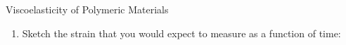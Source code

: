\begin{activity}{Viscoelasticity of Polymeric Materials}
\begin{exercises}
\begin{enumerate}
\begin{enumerate}
						\item Sketch the strain that you would expect to measure as a function of time:
			
				\begin{solution}[1.5in]
				\end{solution}
					\end{enumerate}
			\end{enumerate}
		
\end{exercises}
	
\end{activity}